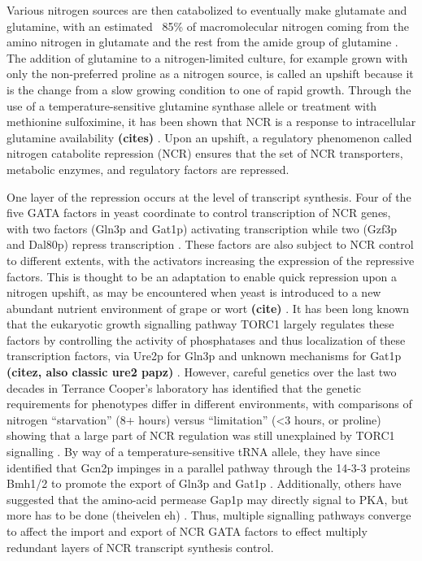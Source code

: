 Various
nitrogen sources are then catabolized to eventually make glutamate and
glutamine, with an estimated ~85\% of macromolecular nitrogen coming
from the amino nitrogen in glutamate and the rest from the amide group
of glutamine 
\parencite{magasanik2002nitrogen}. The addition of glutamine to
a nitrogen-limited culture, for example grown with only the
non-preferred proline as a nitrogen source, is called an upshift
because it is the change from a slow growing condition to one of rapid
growth. Through the use of a temperature-sensitive glutamine synthase
allele or treatment with methionine sulfoximine, it has been shown
that NCR is a response to intracellular glutamine availability
\textbf{(cites)}
. Upon an upshift, a regulatory phenomenon called nitrogen
catabolite repression (NCR) ensures that the set of NCR transporters,
metabolic enzymes, and regulatory factors are repressed.  

One layer of
the repression occurs at the level of transcript synthesis. Four of
the five GATA factors in yeast coordinate to control transcription of
NCR genes, with two factors (Gln3p and Gat1p) activating transcription
while two (Gzf3p and Dal80p) repress transcription 
\parencite{hahn2011transcriptional,stanbrough1995transcriptional}. 
These factors are also subject to NCR
control to different extents, with the activators increasing the
expression of the repressive factors. This is thought to be an
adaptation to enable quick repression upon a nitrogen upshift, as may
be encountered when yeast is introduced to a new abundant nutrient
environment of grape or wort 
\textbf{(cite)}
. It has been long known that the
eukaryotic growth signalling pathway TORC1 largely regulates these
factors by controlling the activity of phosphatases and thus
localization of these transcription factors, via Ure2p for Gln3p 
\parencite{beck1999tor} 
and unknown mechanisms for Gat1p
\textbf{(citez, also classic ure2 papz)}
. However, careful genetics over the last two decades in
Terrance Cooper’s laboratory has identified that the genetic
requirements for phenotypes differ in different environments, with
comparisons of nitrogen “starvation” (8+ hours) versus “limitation”
(<3 hours, or proline) showing that a large part of NCR regulation was
still unexplained by TORC1 signalling 
\parencite{tate2013five}. By way
of a temperature-sensitive tRNA allele, they have since identified
that Gcn2p impinges in a parallel pathway through the 14-3-3 proteins
Bmh1/2 to promote the export of Gln3p and Gat1p 
\parencite{tate2015gata,tate2017general}. 
Additionally, others have suggested that the
amino-acid permease Gap1p may directly signal to PKA, but more has to
be done 
(theivelen eh)
. Thus, multiple signalling pathways converge to
affect the import and export of NCR GATA factors to effect multiply
redundant layers of NCR transcript synthesis control.  

